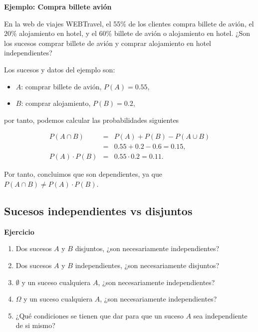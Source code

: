 \documentclass[]{book}
\providecommand{\tightlist}{%
  \setlength{\itemsep}{0pt}\setlength{\parskip}{0pt}}
\begin{document}
\textbf{Ejemplo: Compra billete avión}

En la web de viajes WEBTravel, el 55\% de los clientes compra billete de avión, el \(20\%\) alojamiento en hotel, y el \(60\%\) billete de avión o alojamiento en hotel. ¿Son los sucesos comprar billete de avión y comprar alojamiento en hotel independientes?

Los sucesos y datos del ejemplo son:

\begin{itemize}
\tightlist
\item
  \(A\): comprar billete de avión, \(P(A)=0.55\),
\item
  \(B\): comprar alojamiento, \(P(B)=0.2\),
\end{itemize}

por tanto, podemos calcular las probabilidades siguientes

\begin{eqnarray*}
P(A\cap B) & = &P(A)+P(B)-P(A\cup B)\\ 
& = &0.55+0.2-0.6=0.15,\\ 
P(A)\cdot P(B) & = & 0.55\cdot 0.2=0.11.
\end{eqnarray*}

Por tanto, concluimos que son dependientes, ya que \(P(A\cap B)\neq P(A)\cdot P(B)\).

\hypertarget{sucesos-independientes-vs-disjuntos}{%
\subsection{Sucesos independientes vs disjuntos}\label{sucesos-independientes-vs-disjuntos}}

\textbf{Ejercicio}

\begin{enumerate}
\def\labelenumi{\arabic{enumi}.}
\tightlist
\item
  Dos sucesos \(A\) y \(B\) disjuntos, ¿son necesariamente independientes?
\item
  Dos sucesos \(A\) y \(B\) independientes, ¿son necesariamente disjuntos?
\item
  \(\emptyset\) y un suceso cualquiera \(A\), ¿son necesariamente independientes?
\item
  \(\Omega\) y un suceso cualquiera \(A\), ¿son necesariamente independientes?
\item
  ¿Qué condiciones se tienen que dar para que un suceso \(A\) sea independiente de si mismo?
\end{enumerate}
\end{document}
